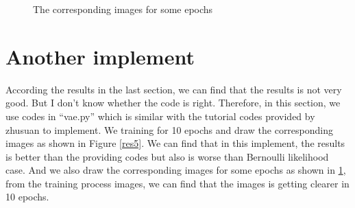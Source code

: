 \documentclass{elegantbook}
\begin{document}
\begin{figure}[!h]
	\hspace{0.1in}
	\hspace{0.1in}
	\caption{\label{res4}The corresponding images for some epochs}
\end{figure}
\section{Another implement}
According the results in the last section, we can find that the results is not very good. But I don't know whether the code is right. Therefore, in this section, we use codes in ``vae.py'' which is similar with the tutorial codes provided by zhusuan to implement. We training for 10 epochs and draw the corresponding images as shown in Figure \ref{res5}. We can find that in this implement, the results is better than the providing codes but also is worse than Bernoulli likelihood case. And we also draw the corresponding images for some epochs as shown in \ref{res4}, from the training process images, we can find that the images is getting clearer in 10 epochs.
\end{document}
